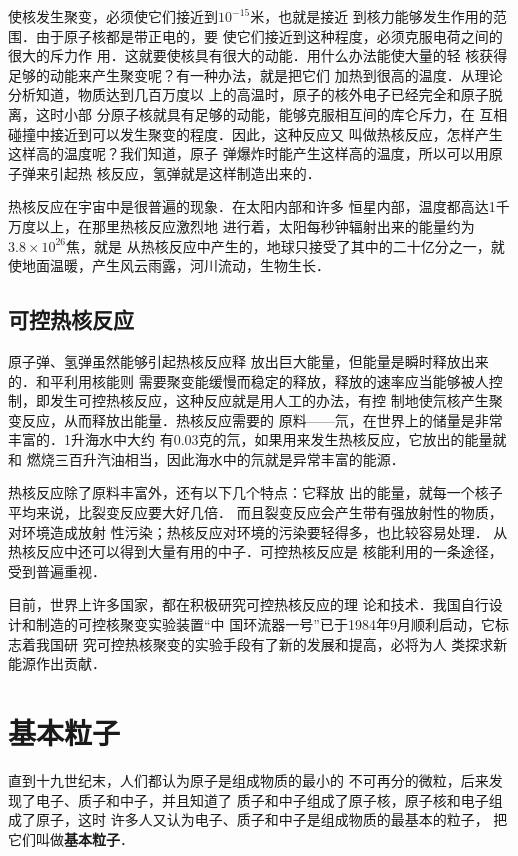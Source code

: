使核发生聚变，必须使它们接近到$10^{-15}$米，也就是接近
到核力能够发生作用的范围．由于原子核都是带正电的，要
使它们接近到这种程度，必须克服电荷之间的很大的斥力作
用．这就要使核具有很大的动能．用什么办法能使大量的轻
核获得足够的动能来产生聚变呢？有一种办法，就是把它们
加热到很高的温度．从理论分析知道，物质达到几百万度以
上的高温时，原子的核外电子已经完全和原子脱离，这时小部
分原子核就具有足够的动能，能够克服相互间的库仑斥力，在
互相碰撞中接近到可以发生聚变的程度．因此，这种反应又
叫做热核反应，怎样产生这样高的温度呢？我们知道，原子
弹爆炸时能产生这样高的温度，所以可以用原子弹来引起热
核反应，氢弹就是这样制造出来的．

热核反应在宇宙中是很普遍的现象．在太阳内部和许多
恒星内部，温度都高达1千万度以上，在那里热核反应激烈地
进行着，太阳每秒钟辐射出来的能量约为$3.8\times10^{26}$焦，就是
从热核反应中产生的，地球只接受了其中的二十亿分之一，就
使地面温暖，产生风云雨露，河川流动，生物生长．

\subsection{可控热核反应}

原子弹、氢弹虽然能够引起热核反应释
放出巨大能量，但能量是瞬时释放出来的．和平利用核能则
需要聚变能缓慢而稳定的释放，释放的速率应当能够被人控
制，即发生可控热核反应，这种反应就是用人工的办法，有控
制地使氘核产生聚变反应，从而释放出能量．热核反应需要的
原料——氘，在世界上的储量是非常丰富的．1升海水中大约
有0.03克的氘，如果用来发生热核反应，它放出的能量就和
燃烧三百升汽油相当，因此海水中的氘就是异常丰富的能源．

热核反应除了原料丰富外，还有以下几个特点：它释放
出的能量，就每一个核子平均来说，比裂变反应要大好几倍．
而且裂变反应会产生带有强放射性的物质，对环境造成放射
性污染；热核反应对环境的污染要轻得多，也比较容易处理．
从热核反应中还可以得到大量有用的中子．可控热核反应是
核能利用的一条途径，受到普遍重视．

目前，世界上许多国家，都在积极研究可控热核反应的理
论和技术．我国自行设计和制造的可控核聚变实验装置“中
国环流器一号”已于1984年9月顺利启动，它标志着我国研
究可控热核聚变的实验手段有了新的发展和提高，必将为人
类探求新能源作出贡献．

\section{基本粒子}

直到十九世纪末，人们都认为原子是组成物质的最小的
不可再分的微粒，后来发现了电子、质子和中子，并且知道了
质子和中子组成了原子核，原子核和电子组成了原子，这时
许多人又认为电子、质子和中子是组成物质的最基本的粒子，
把它们叫做\textbf{基本粒子}．

